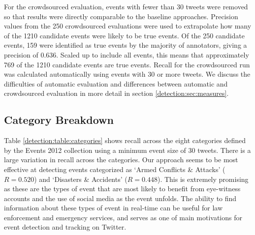 For the crowdsourced evaluation, events with fewer than 30 tweets were removed so that results were directly comparable to the baseline approaches.
Precision values from the 250 crowdsourced evaluations were used to extrapolate how many of the 1210 candidate events were likely to be true events.
Of the 250 candidate events, 159 were identified as true events by the majority of annotators, giving a precision of 0.636.
Scaled up to include all events, this means that approximately 769 of the 1210 candidate events are true events.
Recall for the crowdsourced run was calculated automatically using events with 30 or more tweets.
We discuss the difficulties of automatic evaluation and differences between automatic and crowdsourced evaluation in more detail in section \ref{detection:sec:measures}.




\subsection{Category Breakdown}

Table \ref{detection:table:categories} shows recall across the eight categories defined by the Events 2012 collection using a minimum event size of 30 tweets.
There is a large variation in recall across the categories.
Our approach seems to be most effective at detecting events categorized as  `Armed Conflicts \& Attacks' ($R=0.520$) and `Disasters \& Accidents' ($R=0.448$).
This is extremely promising as these are the types of event that are most likely to benefit from eye-witness accounts and the use of social media as the event unfolds.
The ability to find information about these types of event in real-time can be useful for law enforcement and emergency services, and serves as one of main motivations for event detection and tracking on Twitter.

